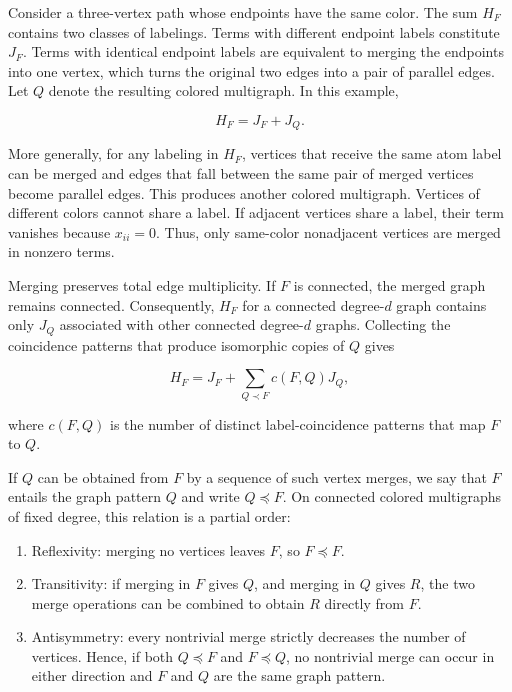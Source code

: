 Consider a three-vertex path whose endpoints have the same color. The sum \(H_F\) contains two classes of labelings. Terms with different endpoint labels constitute \(J_F\). Terms with identical endpoint labels are equivalent to merging the endpoints into one vertex, which turns the original two edges into a pair of parallel edges. Let \(Q\) denote the resulting colored multigraph. In this example,

\[
H_F=J_F+J_Q.
\]

More generally, for any labeling in \(H_F\), vertices that receive the same atom label can be merged and edges that fall between the same pair of merged vertices become parallel edges. This produces another colored multigraph. Vertices of different colors cannot share a label. If adjacent vertices share a label, their term vanishes because \(x_{ii}=0\). Thus, only same-color nonadjacent vertices are merged in nonzero terms.

Merging preserves total edge multiplicity. If \(F\) is connected, the merged graph remains connected. Consequently, \(H_F\) for a connected degree-\(d\) graph contains only \(J_Q\) associated with other connected degree-\(d\) graphs. Collecting the coincidence patterns that produce isomorphic copies of \(Q\) gives

\[
H_F=J_F+\sum_{Q\prec F}c(F,Q)J_Q,
\]

where \(c(F,Q)\) is the number of distinct label-coincidence patterns that map \(F\) to \(Q\).

If \(Q\) can be obtained from \(F\) by a sequence of such vertex merges, we say that \(F\) entails the graph pattern \(Q\) and write \(Q\preceq F\). On connected colored multigraphs of fixed degree, this relation is a partial order:

\begin{enumerate}
\def\labelenumi{\arabic{enumi}.}
\tightlist
\item Reflexivity: merging no vertices leaves \(F\), so \(F\preceq F\).
\item Transitivity: if merging in \(F\) gives \(Q\), and merging in \(Q\) gives \(R\), the two merge operations can be combined to obtain \(R\) directly from \(F\).
\item Antisymmetry: every nontrivial merge strictly decreases the number of vertices. Hence, if both \(Q\preceq F\) and \(F\preceq Q\), no nontrivial merge can occur in either direction and \(F\) and \(Q\) are the same graph pattern.
\end{enumerate}

